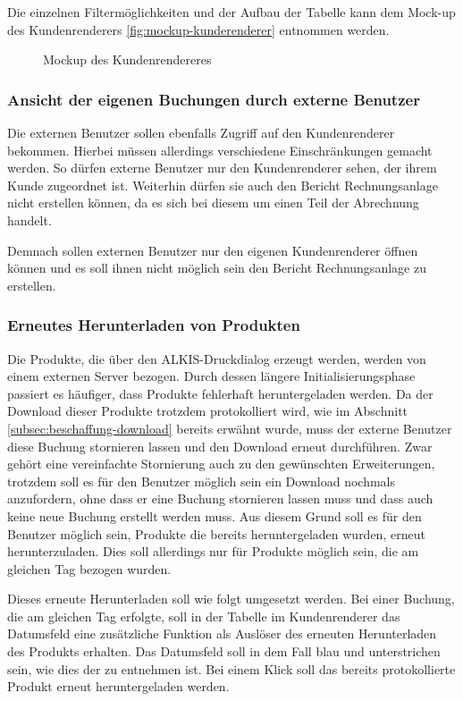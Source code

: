 Die einzelnen Filtermöglichkeiten und der Aufbau der Tabelle kann dem Mock-up des Kundenrenderers \vref{fig:mockup-kunderenderer} entnommen werden.

\begin{figure}[htbp]
	\centering
	\caption{Mockup des Kundenrendereres}
	\label{fig:mockup-kunderenderer}
\end{figure}

\subsubsection{Ansicht der eigenen Buchungen durch externe Benutzer}
Die externen Benutzer sollen ebenfalls Zugriff auf den Kundenrenderer bekommen. Hierbei müssen allerdings verschiedene Einschränkungen gemacht werden.
So dürfen externe Benutzer nur den Kundenrenderer sehen, der ihrem Kunde zugeordnet ist. Weiterhin dürfen sie auch den Bericht Rechnungsanlage nicht erstellen können, da es sich bei diesem um einen Teil der Abrechnung handelt.

Demnach sollen externen Benutzer nur den eigenen Kundenrenderer öffnen können und es soll ihnen nicht möglich sein den Bericht Rechnungsanlage zu erstellen.

\subsubsection{Erneutes Herunterladen von Produkten}
Die Produkte, die über den ALKIS-Druckdialog erzeugt werden, werden von einem externen Server bezogen.
Durch dessen längere Initialisierungsphase passiert es häufiger, dass Produkte fehlerhaft heruntergeladen werden.
Da der Download dieser Produkte trotzdem protokolliert wird, wie im Abschnitt \vref{subsec:beschaffung-download} bereits erwähnt wurde, muss der externe Benutzer diese Buchung stornieren lassen und den Download erneut durchführen.
Zwar gehört eine vereinfachte Stornierung auch zu den gewünschten Erweiterungen, trotzdem soll es für den Benutzer möglich sein ein Download nochmals anzufordern, ohne dass er eine Buchung stornieren lassen muss und dass auch keine neue Buchung erstellt werden muss.
Aus diesem Grund soll es für den Benutzer möglich sein, Produkte die bereits heruntergeladen wurden, erneut herunterzuladen. Dies soll allerdings nur für Produkte möglich sein, die am gleichen Tag bezogen wurden. 

Dieses erneute Herunterladen soll wie folgt umgesetzt werden. Bei einer Buchung, die am gleichen Tag erfolgte, soll in der Tabelle im Kundenrenderer das Datumsfeld eine zusätzliche Funktion als Auslöser des  erneuten Herunterladen des Produkts erhalten.
Das Datumsfeld soll in dem Fall blau und unterstrichen sein, wie dies der  zu entnehmen ist.
Bei einem Klick soll das bereits protokollierte Produkt erneut heruntergeladen werden.

